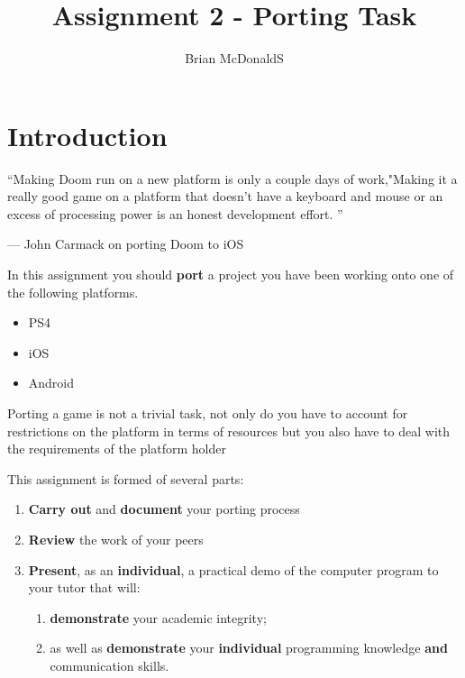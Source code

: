 \documentclass{../../fal_assignment}
\title{Assignment 2 - Porting Task}
\author{Brian McDonaldS}
\begin{document}
\maketitle

%

\section*{Introduction}

\begin{marginquote}
``Making Doom run on a new platform is only a couple days of work,"Making it a really good game on a platform that doesn't have a keyboard and mouse or an excess of processing power is an honest development effort. ''

--- John Carmack on porting Doom to iOS

    \marginquoterule
\end{marginquote}


In this assignment you should \textbf{port} a project you have been working onto one of the following platforms.
\begin{itemize}
	\item PS4
	\item iOS
	\item Android
\end{itemize}

Porting a game is not a trivial task, not only do you have to account for restrictions on the platform in terms of resources but you also have to deal with the requirements of the platform holder

This assignment is formed of several parts:
\begin{enumerate}[label=(\Alph*)]
	\item \textbf{Carry out} and \textbf{document} your porting process
	\item \textbf{Review} the work of your peers
	\item \textbf{Present}, as an \textbf{individual}, a practical demo of the computer program to your tutor that will:
		\begin{enumerate}[label=\roman*.]
			\item \textbf{demonstrate} your academic integrity;
			\item as well as \textbf{demonstrate} your \textbf{individual} programming knowledge \textbf{and} communication skills.
		\end{enumerate}
\end{enumerate}
\end{document}
